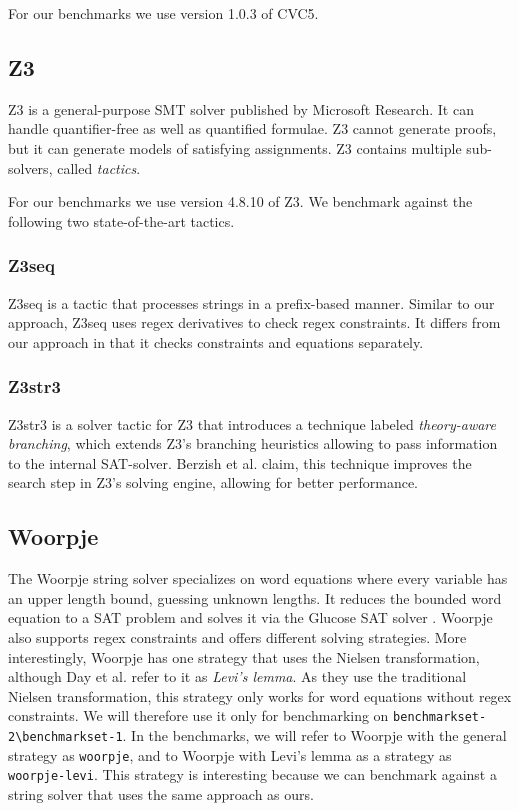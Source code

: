 For our benchmarks we use version 1.0.3 of CVC5.

\subsection{Z3}
Z3 \cite{z3} is a general-purpose SMT solver published by Microsoft Research. It can handle quantifier-free as well as quantified formulae. Z3 cannot generate proofs, but it can generate models of satisfying assignments. Z3 contains multiple sub-solvers, called \textit{tactics}.

For our benchmarks we use version 4.8.10 of Z3. We benchmark against the following two state-of-the-art tactics.

\subsubsection{Z3seq}
Z3seq \cite{z3} is a tactic that processes strings in a prefix-based manner. Similar to our approach, Z3seq uses regex derivatives to check regex constraints. It differs from our approach in that it checks constraints and equations separately.

\subsubsection{Z3str3}
Z3str3 \cite{z3str3} is a solver tactic for Z3 that introduces a technique labeled \textit{theory-aware branching}, which extends Z3's branching heuristics allowing to pass information to the internal SAT-solver. Berzish et al. \cite{z3str3} claim, this technique improves the search step in Z3's solving engine, allowing for better performance.

\subsection{Woorpje}
The Woorpje string solver \cite{woorpje} specializes on word equations where every variable has an upper length bound, guessing unknown lengths. It reduces the bounded word equation to a SAT problem and solves it via the Glucose SAT solver \cite{glucose}. Woorpje also supports regex constraints and offers different solving strategies. More interestingly, Woorpje has one strategy that uses the Nielsen transformation, although Day et al. \cite{woorpje} refer to it as \textit{Levi's lemma}. As they use the traditional Nielsen transformation, this strategy only works for word equations without regex constraints. We will therefore use it only for benchmarking on \texttt{benchmarkset-2\:\textbackslash\:benchmarkset-1}. In the benchmarks, we will refer to Woorpje with the general strategy as \texttt{woorpje}, and to Woorpje with Levi's lemma as a strategy as \texttt{woorpje-levi}. This strategy is interesting because we can benchmark against a string solver that uses the same approach as ours.

